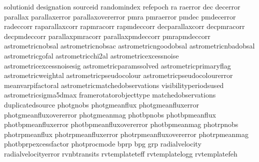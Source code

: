\documentclass[letterpaper,10pt,english]{sphinxmanual}
\begin{document}
\begin{sphinxVerbatim}[commandchars=\\\{\}]
solution\PYGZus{}id
designation
source\PYGZus{}id
random\PYGZus{}index
ref\PYGZus{}epoch
ra
ra\PYGZus{}error
dec
dec\PYGZus{}error
parallax
parallax\PYGZus{}error
parallax\PYGZus{}over\PYGZus{}error
pmra
pmra\PYGZus{}error
pmdec
pmdec\PYGZus{}error
ra\PYGZus{}dec\PYGZus{}corr
ra\PYGZus{}parallax\PYGZus{}corr
ra\PYGZus{}pmra\PYGZus{}corr
ra\PYGZus{}pmdec\PYGZus{}corr
dec\PYGZus{}parallax\PYGZus{}corr
dec\PYGZus{}pmra\PYGZus{}corr
dec\PYGZus{}pmdec\PYGZus{}corr
parallax\PYGZus{}pmra\PYGZus{}corr
parallax\PYGZus{}pmdec\PYGZus{}corr
pmra\PYGZus{}pmdec\PYGZus{}corr
astrometric\PYGZus{}n\PYGZus{}obs\PYGZus{}al
astrometric\PYGZus{}n\PYGZus{}obs\PYGZus{}ac
astrometric\PYGZus{}n\PYGZus{}good\PYGZus{}obs\PYGZus{}al
astrometric\PYGZus{}n\PYGZus{}bad\PYGZus{}obs\PYGZus{}al
astrometric\PYGZus{}gof\PYGZus{}al
astrometric\PYGZus{}chi2\PYGZus{}al
astrometric\PYGZus{}excess\PYGZus{}noise
astrometric\PYGZus{}excess\PYGZus{}noise\PYGZus{}sig
astrometric\PYGZus{}params\PYGZus{}solved
astrometric\PYGZus{}primary\PYGZus{}flag
astrometric\PYGZus{}weight\PYGZus{}al
astrometric\PYGZus{}pseudo\PYGZus{}colour
astrometric\PYGZus{}pseudo\PYGZus{}colour\PYGZus{}error
mean\PYGZus{}varpi\PYGZus{}factor\PYGZus{}al
astrometric\PYGZus{}matched\PYGZus{}observations
visibility\PYGZus{}periods\PYGZus{}used
astrometric\PYGZus{}sigma5d\PYGZus{}max
frame\PYGZus{}rotator\PYGZus{}object\PYGZus{}type
matched\PYGZus{}observations
duplicated\PYGZus{}source
phot\PYGZus{}g\PYGZus{}n\PYGZus{}obs
phot\PYGZus{}g\PYGZus{}mean\PYGZus{}flux
phot\PYGZus{}g\PYGZus{}mean\PYGZus{}flux\PYGZus{}error
phot\PYGZus{}g\PYGZus{}mean\PYGZus{}flux\PYGZus{}over\PYGZus{}error
phot\PYGZus{}g\PYGZus{}mean\PYGZus{}mag
phot\PYGZus{}bp\PYGZus{}n\PYGZus{}obs
phot\PYGZus{}bp\PYGZus{}mean\PYGZus{}flux
phot\PYGZus{}bp\PYGZus{}mean\PYGZus{}flux\PYGZus{}error
phot\PYGZus{}bp\PYGZus{}mean\PYGZus{}flux\PYGZus{}over\PYGZus{}error
phot\PYGZus{}bp\PYGZus{}mean\PYGZus{}mag
phot\PYGZus{}rp\PYGZus{}n\PYGZus{}obs
phot\PYGZus{}rp\PYGZus{}mean\PYGZus{}flux
phot\PYGZus{}rp\PYGZus{}mean\PYGZus{}flux\PYGZus{}error
phot\PYGZus{}rp\PYGZus{}mean\PYGZus{}flux\PYGZus{}over\PYGZus{}error
phot\PYGZus{}rp\PYGZus{}mean\PYGZus{}mag
phot\PYGZus{}bp\PYGZus{}rp\PYGZus{}excess\PYGZus{}factor
phot\PYGZus{}proc\PYGZus{}mode
bp\PYGZus{}rp
bp\PYGZus{}g
g\PYGZus{}rp
radial\PYGZus{}velocity
radial\PYGZus{}velocity\PYGZus{}error
rv\PYGZus{}nb\PYGZus{}transits
rv\PYGZus{}template\PYGZus{}teff
rv\PYGZus{}template\PYGZus{}logg
rv\PYGZus{}template\PYGZus{}fe\PYGZus{}h

\end{sphinxVerbatim}
\end{document}
